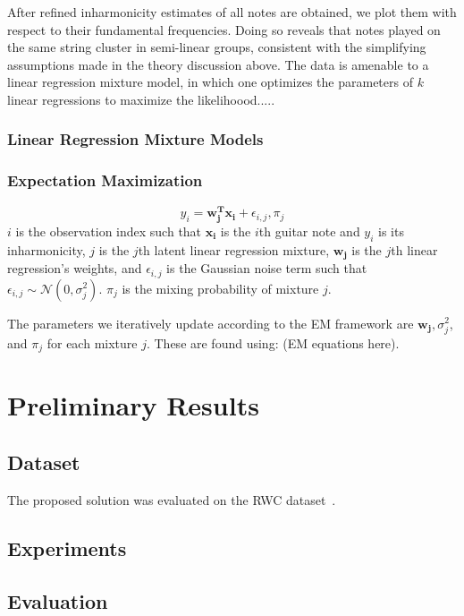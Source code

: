 \documentclass[12pt]{cmuthesis}
\begin{document}
After refined inharmonicity estimates of all notes are obtained, we plot them with respect to their fundamental frequencies. Doing so reveals that notes played on the same string cluster in semi-linear groups, consistent with the simplifying assumptions made in the theory discussion above. The data is amenable to a linear regression mixture model, in which one optimizes the parameters of ${k}$ linear regressions to maximize the likelihoood..... ~\cite{faria2010}
\subsection{Linear Regression Mixture Models}
\subsection{Expectation Maximization}


\begin{equation}
y_i = \mathbf{w_{j}^{T}}\mathbf{x_{i}} + \epsilon_{i,j}, \pi_{j}
\end{equation}
$i$ is the observation index such that $\mathbf{x_i}$ is the $i$th guitar note and $y_i$ is its inharmonicity, $j$ is the $j$th latent linear regression mixture, $\mathbf{w_j}$ is the $j$th linear regression's weights, and $\epsilon_{i,j}$ is the Gaussian noise term such that $\epsilon_{i,j}\sim \mathcal{N}(0,\sigma_{j}^2)$. $\pi_j$ is the mixing probability of mixture $j$.

The parameters we iteratively update according to the EM framework are $\mathbf{w_j}, \sigma_{j}^2$, and $\pi_j$ for each mixture $j$. These are found using: (EM equations here).


\singlespacing

\chapter{Preliminary Results}
\doublespacing

\section{Dataset}
The proposed solution was evaluated on the RWC dataset~\cite{goto2003}. 

\section{Experiments}

\section{Evaluation}
\end{document}
